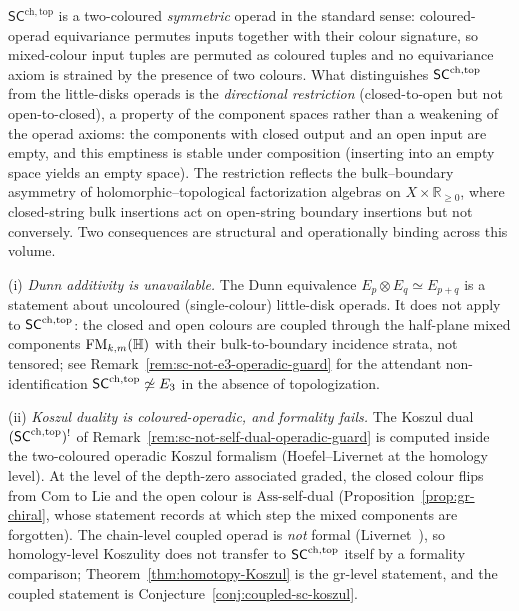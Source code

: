 \begin{remark}
\label{rem:sc-chtop-not-operad}
$\mathsf{SC}^{\mathrm{ch,top}}$ is a two-coloured \emph{symmetric}
operad in the standard sense: coloured-operad equivariance permutes
inputs together with their colour signature, so mixed-colour input
tuples are permuted as coloured tuples and no equivariance axiom is
strained by the presence of two colours. What distinguishes
$\mathsf{SC}^{\mathrm{ch},\mathrm{top}}$ from the little-disks operads is the \emph{directional
restriction} (closed-to-open but not open-to-closed), a property of
the component spaces rather than a weakening of the operad axioms:
the components with closed output and an open input are empty, and
this emptiness is stable under composition (inserting into an empty
space yields an empty space). The restriction reflects the
bulk--boundary asymmetry of holomorphic--topological factorization
algebras on $X \times \mathbb{R}_{\geq 0}$, where closed-string
bulk insertions act on open-string boundary insertions but not
conversely. Two consequences are structural and operationally
binding across this volume.

(i) \emph{Dunn additivity is unavailable.} The Dunn equivalence
$E_p \otimes E_q \simeq E_{p+q}$ is a statement about uncoloured
(single-colour) little-disk operads. It does not apply to
$\mathsf{SC}^{\mathrm{ch},\mathrm{top}}$: the closed and open colours are coupled through the
half-plane mixed components $\mathrm{FM}_{k,m}(\mathbb H)$ with their
bulk-to-boundary incidence strata, not tensored; see
Remark~\ref{rem:sc-not-e3-operadic-guard} for the attendant
non-identification $\mathsf{SC}^{\mathrm{ch},\mathrm{top}} \not\simeq E_3$ in the absence of
topologization.

(ii) \emph{Koszul duality is coloured-operadic, and formality
fails.} The Koszul dual $(\mathsf{SC}^{\mathrm{ch},\mathrm{top}})^!$ of
Remark~\ref{rem:sc-not-self-dual-operadic-guard} is computed inside
the two-coloured operadic Koszul formalism (Hoefel--Livernet
\cite{HL12} at the homology level). At the level of the depth-zero
associated graded, the closed colour flips from $\mathrm{Com}$ to
$\mathrm{Lie}$ and the open colour is $\mathrm{Ass}$-self-dual
(Proposition~\ref{prop:gr-chiral}, whose statement records at which
step the mixed components are forgotten). The chain-level coupled
operad is \emph{not} formal (Livernet~\cite{Liv15}), so
homology-level Koszulity does not transfer to $\mathsf{SC}^{\mathrm{ch},\mathrm{top}}$ itself by
a formality comparison; Theorem~\ref{thm:homotopy-Koszul} is the
gr-level statement, and the coupled statement is
Conjecture~\ref{conj:coupled-sc-koszul}.
\end{remark}

